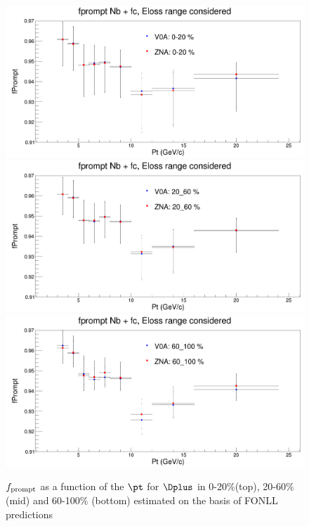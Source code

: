 \begin{figure}
\centering
{\includegraphics[width=0.6\linewidth]{Centrality_DPlus/Dplus/Cmp_Prompt/fPrompt_0_20.png}}
{\includegraphics[width=0.6\linewidth]{Centrality_DPlus/Dplus/Cmp_Prompt/fPrompt_20_60.png}}
{\includegraphics[width=0.6\linewidth]{Centrality_DPlus/Dplus/Cmp_Prompt/fPrompt_60_100.png}}
\caption{$f_{\rm prompt}$ as a function of the $\pt$ for $\Dplus$ in 0-20$\%$(top), 20-60$\%$ (mid) and 60-100$\%$ (bottom) estimated on the basis of FONLL predictions}
\label{fpromptDplus}
\end{figure}

